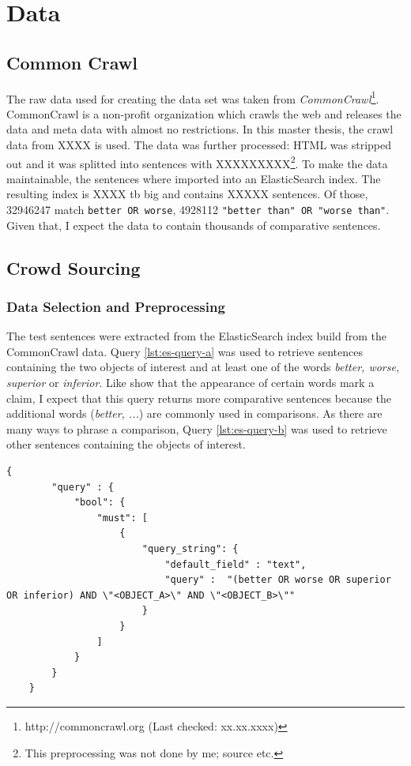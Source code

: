 \chapter{Data}
\section{Common Crawl}
The raw data used for creating the data set was taken from \emph{CommonCrawl}\footnote{http://commoncrawl.org (Last checked: xx.xx.xxxx)}. CommonCrawl is a non-profit organization which crawls the web and releases the data and meta data with almost no restrictions.
In this master thesis, the crawl data from XXXX is used. The data was further processed: HTML was stripped out and it was splitted into sentences with XXXXXXXXX\footnote{This preprocessing was not done by me; source etc.}. To make the data maintainable, the sentences where imported into an ElasticSearch index. The resulting index is XXXX tb big and contains XXXXX sentences. Of those, 32946247 match \texttt{better OR worse}, 4928112 \texttt{"better than" OR "worse than"}. Given that, I expect the data to contain thousands of comparative sentences.

\section{Crowd Sourcing}
\subsection{Data Selection and Preprocessing}
\label{sec:prestudy-processing}
The test sentences were extracted from the ElasticSearch index build from the CommonCrawl data. Query \ref{lst:es-query-a} was used to retrieve sentences containing the two objects of interest and at least one of the words \emph{better, worse, superior} or \emph{inferior}. Like \cite{Daxenberger2017What-is-the-Ess} show that the appearance of certain words mark a claim, I expect that this query returns more comparative sentences because the additional words (\emph{better, ...}) are commonly used in comparisons. As there are many ways to phrase a comparison, Query \ref{lst:es-query-b} was used to retrieve other sentences containing the objects of interest.

\begin{lstlisting}[label=lst:es-query-a,breaklines=true,postbreak=\mbox{\textcolor{red}{$\hookrightarrow$}\space}]
  {
        "query" : {
            "bool": {
                "must": [
                    {
                        "query_string": {
                            "default_field" : "text",
                            "query" :  "(better OR worse OR superior OR inferior) AND \"<OBJECT_A>\" AND \"<OBJECT_B>\""
                        }
                    }
                ]
            }
        }
    }
\end{lstlisting}

